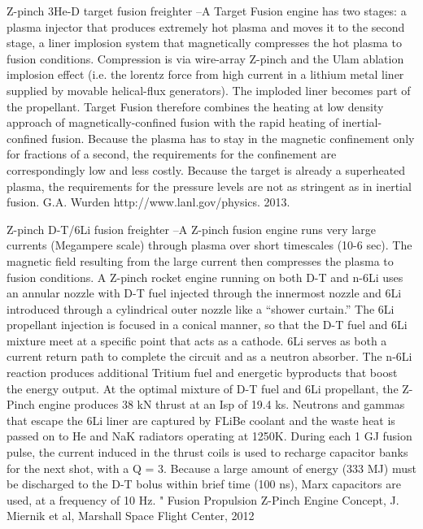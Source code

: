 \documentclass[a4paper]{book}
\begin{document}
Z-pinch 3He-D target fusion freighter –A Target Fusion engine has two stages: a plasma injector that produces extremely hot plasma and moves it to the second stage, a liner implosion system that magnetically compresses the hot plasma to fusion conditions. Compression is via wire-array Z-pinch and the Ulam ablation implosion effect (i.e. the lorentz force from high current in a lithium metal liner supplied by movable helical-flux generators). The imploded liner becomes part of the propellant. Target Fusion therefore combines the heating at low density approach of magnetically-confined fusion with the rapid heating of inertial-confined fusion. Because the plasma has to stay in the magnetic confinement only for fractions of a second, the requirements for the confinement are correspondingly low and less costly. Because the target is already a superheated plasma, the requirements for the pressure levels are not as stringent as in inertial fusion. G.A. Wurden http://www.lanl.gov/physics. 2013.
 
Z-pinch D-T/6Li fusion freighter –A Z-pinch fusion engine runs very large currents (Megampere scale) through plasma over short timescales (10-6 sec). The magnetic field resulting from the large current then compresses the plasma to fusion conditions. A Z-pinch rocket engine running on both D-T and n-6Li uses an annular nozzle with D-T fuel injected through the innermost nozzle and 6Li introduced through a cylindrical outer nozzle like a “shower curtain.” The 6Li propellant injection is focused in a conical manner, so that the D-T fuel and 6Li mixture meet at a specific point that acts as a cathode. 6Li serves as both a current return path to complete the circuit and as a neutron absorber. The n-6Li reaction produces additional Tritium fuel and energetic byproducts that boost the energy output. At the optimal mixture of D-T fuel and 6Li propellant, the Z-Pinch engine produces 38 kN thrust at an Isp of 19.4 ks. Neutrons and gammas that escape the 6Li liner are captured by FLiBe coolant and the waste heat is passed on to He and NaK radiators operating at 1250K. During each 1 GJ fusion pulse, the current induced in the thrust coils is used to recharge capacitor banks for the next shot, with a Q = 3. Because a large amount of energy (333 MJ) must be discharged to the D-T bolus within brief time (100 ns), Marx capacitors are used, at a frequency of 10 Hz. " Fusion Propulsion Z-Pinch Engine Concept, J. Miernik et al, Marshall Space Flight Center, 2012
 
\end{document}
